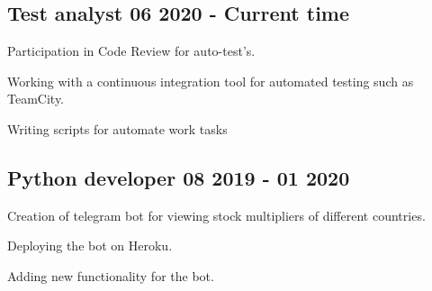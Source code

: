 \documentclass[a4paper,12pt]{article}
\begin{document}

\vspace*{2pt}

\subsection{{Test analyst }\hfill 06 2020 - Current time}
\begin{zitemize}
\item Participation in Code Review for auto-test's.
\item Working with a continuous integration tool for automated testing such as TeamCity.
\item Writing scripts for automate work tasks
\end{zitemize}

\vspace*{5pt}

\subsection{{Python developer }\hfill 08 2019 - 01 2020}
\begin{zitemize}
\item Creation of telegram bot for viewing stock multipliers of different countries.
\item Deploying the bot on Heroku.
\item Adding new functionality for the bot.
\end{zitemize}

\end{document}
